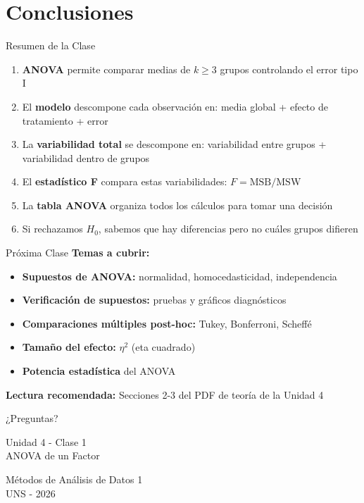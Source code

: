 \documentclass[10pt,aspectratio=169]{beamer}
\begin{document}
\section{Conclusiones}

\begin{frame}{Resumen de la Clase}
\begin{enumerate}
    \item \textbf{ANOVA} permite comparar medias de $k \geq 3$ grupos controlando el error tipo I
    
    \item El \textbf{modelo} descompone cada observación en: media global + efecto de tratamiento + error
    
    \item La \textbf{variabilidad total} se descompone en: variabilidad entre grupos + variabilidad dentro de grupos
    
    \item El \textbf{estadístico F} compara estas variabilidades: $F = \text{MSB} / \text{MSW}$
    
    \item La \textbf{tabla ANOVA} organiza todos los cálculos para tomar una decisión
    
    \item Si rechazamos $H_0$, sabemos que hay diferencias pero \alert{no cuáles grupos difieren}
\end{enumerate}
\end{frame}

\begin{frame}{Próxima Clase}
\textbf{Temas a cubrir:}

\begin{itemize}
    \item \textbf{Supuestos de ANOVA:} normalidad, homocedasticidad, independencia
    \item \textbf{Verificación de supuestos:} pruebas y gráficos diagnósticos
    \item \textbf{Comparaciones múltiples post-hoc:} Tukey, Bonferroni, Scheffé
    \item \textbf{Tamaño del efecto:} $\eta^2$ (eta cuadrado)
    \item \textbf{Potencia estadística} del ANOVA
\end{itemize}

\vspace{0.5cm}

\textbf{Lectura recomendada:} Secciones 2-3 del PDF de teoría de la Unidad 4
\end{frame}

\begin{frame}
\begin{center}
{\Huge ¿Preguntas?}

\vspace{1cm}

\Large Unidad 4 - Clase 1 \\
ANOVA de un Factor

\vspace{0.5cm}

\normalsize
Métodos de Análisis de Datos 1 \\
UNS - 2026
\end{center}
\end{frame}
\end{document}
